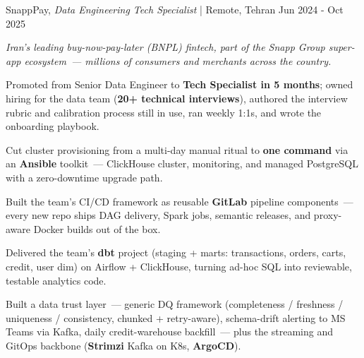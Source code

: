 \begin{cventries2}
  \cventrynew
    {SnappPay, \textnormal{\textit{Data Engineering Tech Specialist} | Remote, Tehran}}
    {Jun 2024 - Oct 2025}
    {
      {\small\itshape Iran's leading buy-now-pay-later (BNPL) fintech, part of the Snapp Group super-app ecosystem~--- millions of consumers and merchants across the country.}\par\vspace{4mm}
      \begin{cvitems}
        \item Promoted from Senior Data Engineer to {\bf Tech Specialist in 5 months}; owned hiring for the data team ({\bf 20+ technical interviews}), authored the interview rubric and calibration process still in use, ran weekly 1:1s, and wrote the onboarding playbook.
        \item Cut cluster provisioning from a multi-day manual ritual to {\bf one command} via an {\bf Ansible} toolkit~--- ClickHouse cluster, monitoring, and managed PostgreSQL with a zero-downtime upgrade path.
        \item Built the team's CI/CD framework as reusable {\bf GitLab} pipeline components~--- every new repo ships DAG delivery, Spark jobs, semantic releases, and proxy-aware Docker builds out of the box.
        \item Delivered the team's {\bf dbt} project (staging + marts: transactions, orders, carts, credit, user dim) on Airflow + ClickHouse, turning ad-hoc SQL into reviewable, testable analytics code.
        \item Built a data trust layer~--- generic DQ framework (completeness / freshness / uniqueness / consistency, chunked + retry-aware), schema-drift alerting to MS Teams via Kafka, daily credit-warehouse backfill~--- plus the streaming and GitOps backbone ({\bf Strimzi} Kafka on K8s, {\bf ArgoCD}).
      \end{cvitems}
    }


\end{cventries2}
